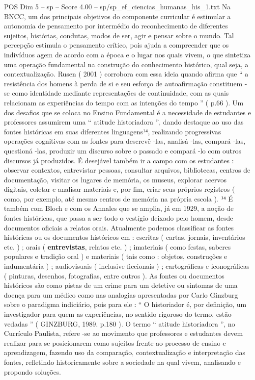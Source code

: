 \begin{textsample}{POS Dim 5 – sp – Score 4.00 – sp/sp\_ef\_ciencias\_humanas\_his\_1.txt}
Na BNCC, um dos principais objetivos do componente curricular é estimular a autonomia de pensamento por intermédio do reconhecimento de diferentes sujeitos, histórias, condutas, modos de ser, agir e pensar sobre o mundo.
Tal percepção estimula o pensamento crítico, pois ajuda a compreender que os indivíduos agem de acordo com a época e o lugar nos quais vivem, o que sintetiza uma operação fundamental na construção do conhecimento histórico, qual seja, a contextualização.
Rusen ( 2001 ) corrobora com essa ideia quando afirma que “ a resistência dos homens à perda de si e seu esforço de autoafirmação constituem -se como identidade mediante representações de continuidade, com as quais relacionam as experiências do tempo com as intenções do tempo ” ( p.66 ).
Um dos desafios que se coloca no Ensino Fundamental é a necessidade de estudantes e professores assumirem uma “ atitude historiadora ”, dando destaque ao uso das fontes históricas em suas diferentes linguagens¹⁴, realizando progressivas operações cognitivas com as fontes para descrevê -las, analisá -las, compará -las, questioná -las, produzir um discurso sobre o passado e compará -lo com outros discursos já produzidos.
É desejável também ir a campo com os estudantes : observar contextos, entrevistar pessoas, consultar arquivos, bibliotecas, centros de documentação, visitar os lugares de memória, os museus, explorar acervos digitais, coletar e analisar materiais e, por fim, criar seus próprios registros ( como, por exemplo, até mesmo centros de memória na própria escola ). ¹⁴ É também com Bloch e com os Annales que se amplia, já em 1929, a noção de fontes históricas, que passa a ser todo o vestígio deixado pelo homem, desde documentos oficiais a relatos orais.
Atualmente podemos classificar as fontes históricas ou os documentos históricos em : escritas ( cartas, jornais, inventários etc. ) ; orais ( \textbf{entrevistas}, relatos etc. ) ; imateriais ( como festas, saberes populares e tradição oral ) e materiais ( tais como : objetos, construções e indumentária ) ; audiovisuais ( inclusive ficcionais ) ; cartográficas e iconográficas ( pinturas, desenhos, fotografias, entre outros ).
As fontes ou documentos históricos são como pistas de um crime para um detetive ou sintomas de uma doença para um médico como nas analogias apresentadas por Carlo Ginzburg sobre o paradigma indiciário, pois para ele : “ O historiador é, por definição, um investigador para quem as experiências, no sentido rigoroso do termo, estão vedadas ” ( GINZBURG, 1989. p.180 ).
O termo “ atitude historiadora ”, no Currículo Paulista, refere -se ao movimento que professores e estudantes devem realizar para se posicionarem como sujeitos frente ao processo de ensino e aprendizagem, fazendo uso da comparação, contextualização e interpretação das fontes, refletindo historicamente sobre a sociedade na qual vivem, analisando e propondo soluções.

\end{textsample}

